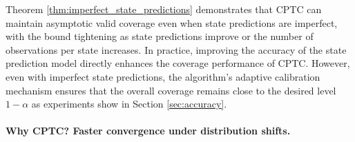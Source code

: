 Theorem \ref{thm:imperfect_state_predictions} demonstrates that CPTC can maintain asymptotic valid coverage even when state predictions are imperfect, with the bound tightening as state predictions improve or the number of observations per state increases. In practice, improving the accuracy of the state prediction model directly enhances the coverage performance of CPTC. However, even with imperfect state predictions, the algorithm's adaptive calibration mechanism ensures that the overall coverage remains close to the desired level \(1 - \alpha\) as experiments show in Section \ref{sec:accuracy}.





\vspace{-0.3em}
\paragraph{Why CPTC? Faster convergence under distribution shifts.}


